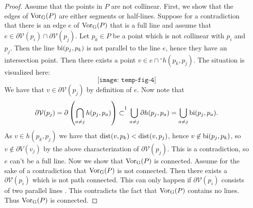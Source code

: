 \begin{proof}
Assume that the points in $P$ are not collinear. First, we show that the edges of $\operatorname{Vor_{G}}(P)$ are either segments or half-lines. Suppose for a contradiction that there is an edge $e$ of $\operatorname{Vor_{G}}(P)$ that is a full line and assume that $e \in \partial\mathcal{V}(p_i) \cap \partial\mathcal{V}(p_j)$. Let $p_k \in P$ be a point which is not collinear with $p_i$ and $p_j$. Then the line $\operatorname{bi}(p_j, p_k)$ is not parallel to the line $e$, hence they have an intersection point. Then there exists a point $v \in e \cap {}^{\circ}h(p_k, p_j)$. The situation is visualized here:
\[
    \texttt{[image: temp-fig-4]}
\]
We have that $v \in \partial\mathcal{V}(p_j)$ by definition of $e$. Now note that
\[
    \partial \mathcal{V}(p_j) = \partial \para{\bigcap_{a \ne j} h(p_j, p_a)} \subset^{\footnotemark} \bigcup_{a \ne j} \partial h(p_j, p_a) = \bigcup_{a \ne j} \bi(p_j, p_a).
\]
As $v \in h(p_k, p_j)$ we have that $\operatorname{dist}(v, p_k) < \operatorname{dist}(v, p_j)$, hence $v \not\in \operatorname{bi}(p_j, p_k)$, so $v \not\in \partial{V}(v_j)$ by the above characterization of $\partial \mathcal{V}(p_j)$.
This is a contradiction, so $e$ can't be a full line. Now we show that $\operatorname{Vor_{G}}(P)$ is connected. Assume for the sake of a contradiction that $\operatorname{Vor_{G}}(P)$ is not connected. Then there exists a $\partial \mathcal{V}(p_i)$ which is not path connected. This can only happen if $\partial \mathcal{V}(p_i)$ consists of two parallel lines . This contradicts the fact that $\operatorname{Vor_{G}}(P)$ contains no lines. Thus $\operatorname{Vor_{G}}(P)$ is connected.
\end{proof}

